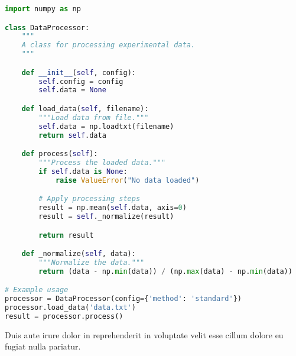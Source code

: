 \documentclass[../main.tex]{subfiles}
\begin{document}
\begin{lstlisting}[language=Python, caption={Complete algorithm implementation}]
import numpy as np

class DataProcessor:
    """
    A class for processing experimental data.
    """

    def __init__(self, config):
        self.config = config
        self.data = None

    def load_data(self, filename):
        """Load data from file."""
        self.data = np.loadtxt(filename)
        return self.data

    def process(self):
        """Process the loaded data."""
        if self.data is None:
            raise ValueError("No data loaded")

        # Apply processing steps
        result = np.mean(self.data, axis=0)
        result = self._normalize(result)

        return result

    def _normalize(self, data):
        """Normalize the data."""
        return (data - np.min(data)) / (np.max(data) - np.min(data))

# Example usage
processor = DataProcessor(config={'method': 'standard'})
processor.load_data('data.txt')
result = processor.process()
\end{lstlisting}

Duis aute irure dolor in reprehenderit in voluptate velit esse cillum dolore eu fugiat nulla pariatur.
\end{document}
